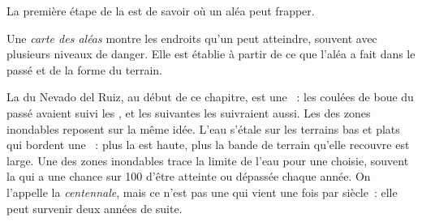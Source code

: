 La première étape de la  est de savoir où un aléa peut frapper.

\begin{definition}\label{def:g9:natural-risks:hazard-map}
Une \emph{carte des aléas} montre les endroits qu'un  peut atteindre, souvent avec plusieurs niveaux de danger. Elle est
établie à partir de ce que l'aléa a fait dans le passé et de la forme du
terrain.
\end{definition}

La  du Nevado del Ruiz, au début de ce chapitre, est une ~: les coulées de boue du passé avaient suivi les , et les
suivantes les suivraient aussi. Les  des zones inondables reposent
sur la même idée. L'eau s'étale sur les terrains bas et plats qui bordent
une ~: plus la  est haute, plus la bande de terrain qu'elle
recouvre est large. Une  des zones inondables trace la limite de
l'eau pour une  choisie, souvent la  qui a une chance sur 100
d'être atteinte ou dépassée chaque année. On l'appelle la \emph{
centennale}, mais ce n'est pas une  qui vient une fois par siècle~:
elle peut survenir deux années de suite.

